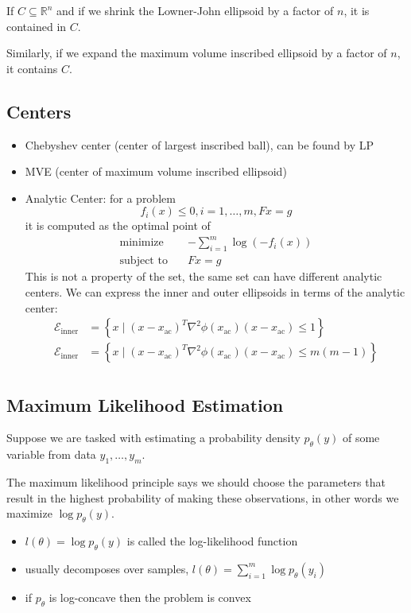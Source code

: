 \documentclass[11pt]{article}
\begin{document}
If $C \subseteq \mathbb{R}^n$ and if we shrink the Lowner-John ellipsoid by a factor of $n$, it is contained in $C$. \par
Similarly, if we expand the maximum volume inscribed ellipsoid by a factor of $n$, it contains $C$. \par

\subsection{Centers} 
\begin{itemize}
    \item Chebyshev center (center of largest inscribed ball), can be found by LP
    \item MVE (center of maximum volume inscribed ellipsoid)
    \item Analytic Center: for a problem 
    \[ f_i(x) \leq 0, i = 1, \ldots, m, Fx = g \] 
    it is computed as the optimal point of 
    \begin{align*}
        \text{minimize} \quad & -\sum_{i=1}^m \log (-f_i(x)) \\
        \text{subject to} \quad & Fx = g
    \end{align*}
    This is not a property of the set, the same set can have different analytic centers. We can express the inner and outer ellipsoids in terms of the analytic center: 
    \begin{align*}
        \mathcal{E}_{\mathrm{inner}} &= \left\{ x \mid (x - x_{\mathrm{ac}})^T \nabla^2\phi(x_{\mathrm{ac}})(x - x_{\mathrm{ac}}) \leq 1 \right\} \\ 
        \mathcal{E}_{\mathrm{inner}} &= \left\{ x \mid (x - x_{\mathrm{ac}})^T \nabla^2\phi(x_{\mathrm{ac}})(x - x_{\mathrm{ac}}) \leq m(m-1) \right\} \\ 
    \end{align*}
\end{itemize}

\subsection{Maximum Likelihood Estimation} 
Suppose we are tasked with estimating a probability density $p_\theta(y)$ of some variable from data $y_1, \ldots, y_m$. \par
The maximum likelihood principle says we should choose the parameters that result in the highest probability of making these observations, in other words we maximize $\log p_\theta(y)$. 
\begin{itemize}
    \item $l(\theta) = \log p_\theta(y)$ is called the log-likelihood function
    \item usually decomposes over samples, $l(\theta) = \sum_{i=1}^m \log p_\theta(y_i)$
    \item if $p_\theta$ is log-concave then the problem is convex
\end{itemize}
\end{document}

